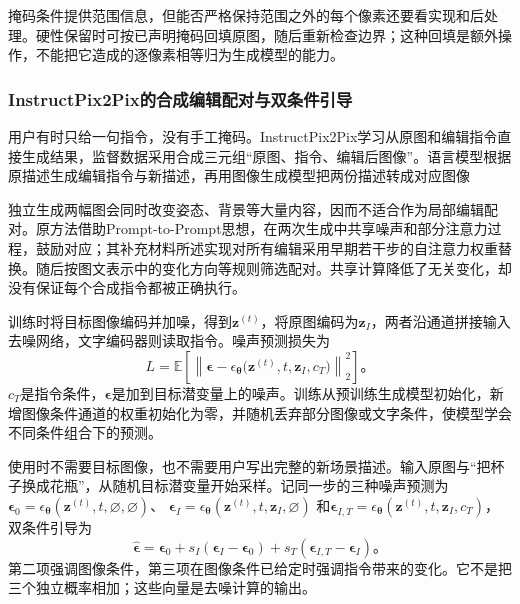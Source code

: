 掩码条件提供范围信息，但能否严格保持范围之外的每个像素还要看实现和后处理。硬性保留时可按已声明掩码回填原图，随后重新检查边界；这种回填是额外操作，不能把它造成的逐像素相等归为生成模型的能力。

\Needspace{60mm}
\subsubsection{InstructPix2Pix的合成编辑配对与双条件引导}
\label{sec:vision-generation-instruct-pix2pix}

用户有时只给一句指令，没有手工掩码。InstructPix2Pix学习从原图和编辑指令直接生成结果，监督数据采用合成三元组“原图、指令、编辑后图像”。语言模型根据原描述生成编辑指令与新描述，再用图像生成模型把两份描述转成对应图像

独立生成两幅图会同时改变姿态、背景等大量内容，因而不适合作为局部编辑配对。原方法借助Prompt-to-Prompt思想，在两次生成中共享噪声和部分注意力过程，鼓励对应；其补充材料所述实现对所有编辑采用早期若干步的自注意力权重替换。随后按图文表示中的变化方向等规则筛选配对。共享计算降低了无关变化，却没有保证每个合成指令都被正确执行。

训练时将目标图像编码并加噪，得到$\bm{z}^{(t)}$，将原图编码为$\bm{z}_{I}$，两者沿通道拼接输入去噪网络，文字编码器则读取指令。噪声预测损失为
\begin{equation}
 L=\mathbb{E}\!\left[
 \left\lVert\bm{\epsilon}-
 \epsilon_{\bm{\theta}}
   \bigl(\bm{z}^{(t)},t,\bm{z}_I,c_T\bigr)
 \right\rVert_2^2\right]\text{。}
 \label{eq:vision-instruct-training}
\end{equation}
$c_T$是指令条件，$\bm{\epsilon}$是加到目标潜变量上的噪声。训练从预训练生成模型初始化，新增图像条件通道的权重初始化为零，并随机丢弃部分图像或文字条件，使模型学会不同条件组合下的预测。

使用时不需要目标图像，也不需要用户写出完整的新场景描述。输入原图与“把杯子换成花瓶”，从随机目标潜变量开始采样。记同一步的三种噪声预测为
$\bm{\epsilon}_0=\epsilon_{\bm{\theta}}(\bm{z}^{(t)},t,\varnothing,\varnothing)$、
$\bm{\epsilon}_I=\epsilon_{\bm{\theta}}(\bm{z}^{(t)},t,\bm{z}_I,\varnothing)$
和$\bm{\epsilon}_{I,T}=\epsilon_{\bm{\theta}}(\bm{z}^{(t)},t,\bm{z}_I,c_T)$，双条件引导为
\begin{equation}
 \hat{\bm{\epsilon}}
 =\bm{\epsilon}_0
  +s_I(\bm{\epsilon}_I-\bm{\epsilon}_0)
  +s_T(\bm{\epsilon}_{I,T}-\bm{\epsilon}_I)\text{。}
 \label{eq:vision-instruct-guidance}
\end{equation}
第二项强调图像条件，第三项在图像条件已给定时强调指令带来的变化。它不是把三个独立概率相加；这些向量是去噪计算的输出。

